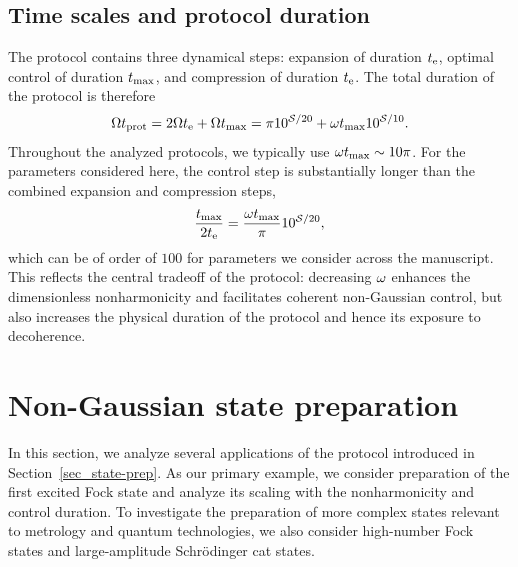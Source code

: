 \documentclass[reprint,prx,footinbib,floatfix,twocolumn,longbibliography,superscriptaddress]{revtex4-2}
\begin{document}
\subsection{Time scales and protocol duration}
The protocol contains three dynamical steps: expansion of duration $t_{\text{e}}$, optimal control of duration $t_\text{max}$, and compression of duration $t_{\text{e}}$.
The total duration of the protocol is therefore
\begin{align}
    \Omega t_{\text{prot}} = 2 \Omega t_{\text{e}} + \Omega t_\text{max} = \pi 10^{\mathcal{S}/20} + \omega t_\text{max} 10^{\mathcal{S}/10}.
\end{align}
Throughout the analyzed protocols, we typically use $\omega t_\text{max} \sim 10 \pi$.
For the parameters considered here, the control step is substantially longer than the combined expansion and compression steps,
\begin{align}
    \frac{t_\text{max}}{2 t_{\text{e}}} = \frac{\omega t_\text{max}}{\pi} 10^{\mathcal{S}/20},
\end{align}
which can be of order of $100$ for parameters we consider across the manuscript.
This reflects the central tradeoff of the protocol: decreasing $\omega$ enhances the dimensionless nonharmonicity and facilitates coherent non-Gaussian control, but also increases the physical duration of the protocol and hence its exposure to decoherence.

\section{Non-Gaussian state preparation}
\label{sec_nongauss}
In this section, we analyze several applications of the protocol introduced in Section~\ref{sec_state-prep}.
As our primary example, we consider preparation of the first excited Fock state and analyze its scaling with the nonharmonicity and control duration.
To investigate the preparation of more complex states relevant to metrology and quantum technologies, we also consider high-number Fock states and large-amplitude Schr\"odinger cat states.
\end{document}

